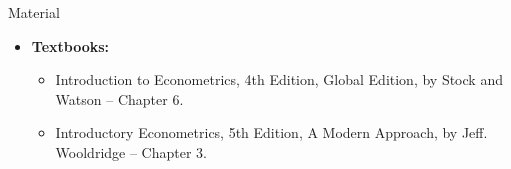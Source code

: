 \documentclass[notes,10pt, aspectratio=169]{beamer}
\begin{document}
\begin{frame}[allowframebreaks]{Material}
\begin{itemize}
    \item[--] \textbf{Textbooks:}
    \begin{itemize}
        \item Introduction to Econometrics, 4th Edition, Global Edition, by Stock and Watson -- Chapter 6.
        \item Introductory Econometrics, 5th Edition, A Modern Approach, by Jeff. Wooldridge -- Chapter 3.
    \end{itemize}
\end{itemize}
\scriptsize{

 
}
\end{frame}
\end{document}
